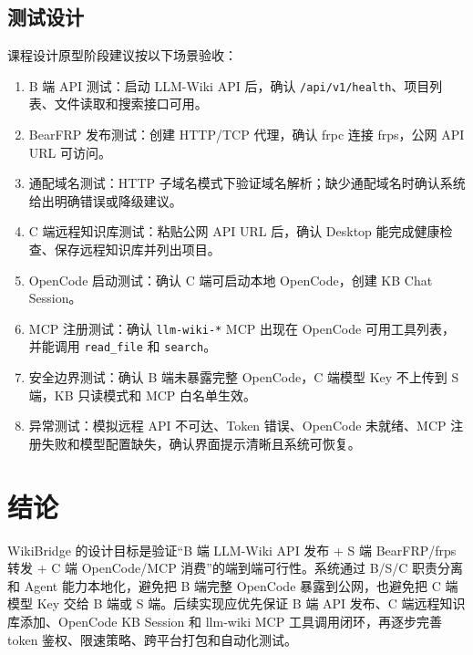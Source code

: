 \documentclass[UTF8,a4paper,12pt,fontset=fandol]{ctexart}
\newcommand{\code}[1]{\texttt{\footnotesize #1}}
\begin{document}
\subsection{测试设计}
课程设计原型阶段建议按以下场景验收：
\begin{enumerate}
  \item B 端 API 测试：启动 LLM-Wiki API 后，确认 \code{/api/v1/health}、项目列表、文件读取和搜索接口可用。
  \item BearFRP 发布测试：创建 HTTP/TCP 代理，确认 frpc 连接 frps，公网 API URL 可访问。
  \item 通配域名测试：HTTP 子域名模式下验证域名解析；缺少通配域名时确认系统给出明确错误或降级建议。
  \item C 端远程知识库测试：粘贴公网 API URL 后，确认 Desktop 能完成健康检查、保存远程知识库并列出项目。
  \item OpenCode 启动测试：确认 C 端可启动本地 OpenCode，创建 KB Chat Session。
  \item MCP 注册测试：确认 \code{llm-wiki-*} MCP 出现在 OpenCode 可用工具列表，并能调用 \code{read\_file} 和 \code{search}。
  \item 安全边界测试：确认 B 端未暴露完整 OpenCode，C 端模型 Key 不上传到 S 端，KB 只读模式和 MCP 白名单生效。
  \item 异常测试：模拟远程 API 不可达、Token 错误、OpenCode 未就绪、MCP 注册失败和模型配置缺失，确认界面提示清晰且系统可恢复。
\end{enumerate}

\section*{结论}
WikiBridge 的设计目标是验证“B 端 LLM-Wiki API 发布 + S 端 BearFRP/frps 转发 + C 端 OpenCode/MCP 消费”的端到端可行性。系统通过 B/S/C 职责分离和 Agent 能力本地化，避免把 B 端完整 OpenCode 暴露到公网，也避免把 C 端模型 Key 交给 B 端或 S 端。后续实现应优先保证 B 端 API 发布、C 端远程知识库添加、OpenCode KB Session 和 llm-wiki MCP 工具调用闭环，再逐步完善 token 鉴权、限速策略、跨平台打包和自动化测试。
\end{document}
